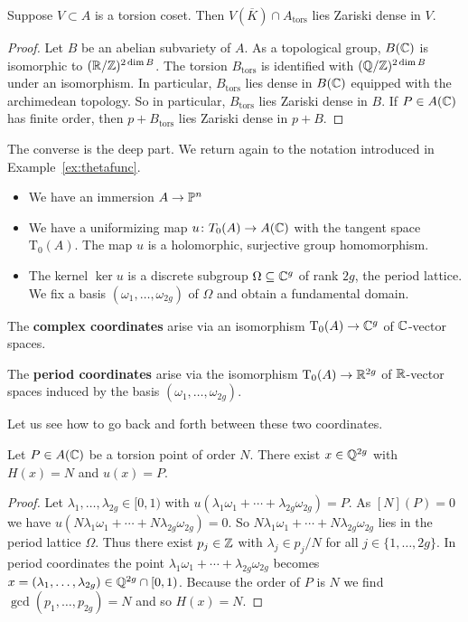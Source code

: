 \begin{lemma}
  Suppose $V\subset A$ is a torsion coset. Then $V(\overline K)\cap
  A_{\mathrm{tors}}$ lies Zariski dense in $V$. 
\end{lemma}
\begin{proof}
  Let $B$ be an abelian subvariety of $A$. 
  As a topological group, $B({\mathbb{C}})$ is isomorphic to
  $({\mathbb{R}}/{\mathbb{Z}})^{2\dim B}$. The torsion $B_{\mathrm{tors}}$ is identified
  with $({\mathbb{Q}}/{\mathbb{Z}})^{2\dim B}$ under an isomorphism. In particular,
  $B_{\mathrm{tors}}$ lies dense in $B({\mathbb{C}})$ equipped with the
  archimedean topology. So in particular, $B_{\mathrm{tors}}$ lies
  Zariski dense in $B$. If $P\in A({\mathbb{C}})$ has finite order, then
  $p+B_{\mathrm{tors}}$ lies Zariski dense in $p+B$. 
\end{proof}

The converse is the deep part. 
We return again to
the notation introduced in Example~\ref{ex:thetafunc}.
\begin{itemize}
\item We have an immersion $A\rightarrow{\mathbb{P}}^n$
\item We have a uniformizing map $u\colon T_0(A)\rightarrow
  A({\mathbb{C}})$  with the tangent space
  $\mathrm{T}_0(A)$. The map $u$ is a holomorphic, surjective group
  homomorphism.
\item The kernel $\ker u$ is a discrete subgroup $\Omega\subseteq{\mathbb{C}}^g$
  of rank $2g$, the period lattice. We fix a basis $(\omega_1,\ldots,\omega_{2g})$ of
  $\Omega$ and obtain a fundamental domain.
\end{itemize}


\bigskip
\noindent The \textbf{complex coordinates} arise via an isomorphism
$\mathrm{T}_0(A)\rightarrow{\mathbb{C}}^g$ of ${\mathbb{C}}$-vector spaces. 



\bigskip
\noindent The \textbf{period coordinates} arise via the isomorphism
$\mathrm{T}_0(A)\rightarrow {\mathbb{R}}^{2g}$ of ${\mathbb{R}}$-vector spaces
induced by the basis $(\omega_1,\ldots,\omega_{2g})$. 

Let us see how to go back and forth between these two coordinates.

\begin{lemma}
  \label{lem:rationalpreimage}
  Let $P\in A({\mathbb{C}})$ be a torsion point of order $N$.
  There exist $x\in {\mathbb{Q}}^{2g}$ with $H(x)=N$ and $u(x)=P$. 
\end{lemma}
\begin{proof}
  Let $\lambda_1,\ldots,\lambda_{2g}\in [0,1)$ with
  $u(\lambda_1\omega_1+\cdots+\lambda_{2g}\omega_{2g}) = P$.
  As $[N](P)=0$ we have
  $u(N\lambda_1\omega_1+\cdots +N\lambda_{2g}\omega_{2g})=0$.
  So $N\lambda_1\omega_1+\cdots +N\lambda_{2g}\omega_{2g}$ lies in the
  period lattice $\Omega$. Thus there exist $p_j\in {\mathbb{Z}}$ with
  $\lambda_j\in p_j/N$ for all $j\in\{1,\ldots,2g\}$.
  In period coordinates the point
  $\lambda_1\omega_1+\cdots+\lambda_{2g}\omega_{2g}$ becomes
  $x=(\lambda_1,\ldots,\lambda_{2g})\in {\mathbb{Q}}^{2g}\cap [0,1)$.
  Because the order of $P$ is $N$ we find $\gcd(p_1,\ldots,p_{2g})=N$
  and so $H(x)=N$. 
\end{proof}



